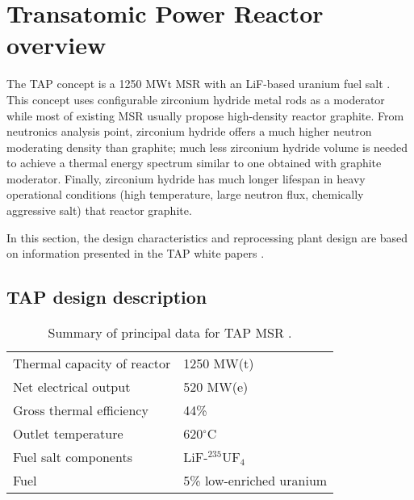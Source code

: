 \section{Transatomic Power Reactor overview}
The \gls{TAP} concept is a 1250 MWt \gls{MSR} with an LiF-based uranium fuel salt 
\cite{transatomic_power_corporation_technical_2016}. This concept uses 
configurable zirconium hydride metal rods as a moderator while most of existing 
\gls{MSR} usually propose high-density reactor graphite. From neutronics analysis 
point, zirconium hydride offers a much higher neutron moderating density than graphite;
much less zirconium hydride volume is needed to achieve a thermal energy spectrum similar to one obtained with graphite moderator. Finally, zirconium hydride has 
much longer lifespan in heavy operational conditions (high temperature, large 
neutron flux, chemically aggressive salt) that reactor graphite.

In this section, the design characteristics and reprocessing plant design 
are based on information presented in the \gls{TAP} white papers \cite{transatomic_power_corporation_technical_2016, transatomic_power_corporation_neutronics_2016}.

\subsection{TAP design description}
\begin{table}[h!]
        \caption{Summary of principal data for \gls{TAP} \gls{MSR} \cite{transatomic_power_corporation_technical_2016, betzler_assessment_2017}. }
        \begin{tabularx}{\textwidth}{ s  s}
        \hline
         Thermal capacity of reactor           		& 1250 MW(t)             \\ 
         Net electrical output                 		& 520 MW(e) \\ 
         Gross thermal efficiency        			& 44\%     \\  
         Outlet temperature							& 620$^{\circ}$C         \\ 
		 Fuel salt components                   & LiF-$^{235}$UF$_4$	\\  
         Fuel                                   & 5\% low-enriched uranium          \\
\hline
        \end{tabularx}
        \label{tab:tap_tab}
\end{table}


